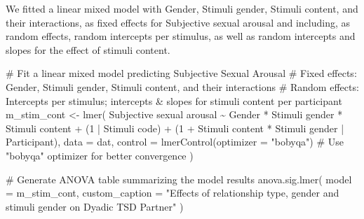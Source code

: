 \documentclass[
  bookmarksnumbered]{article}
\newenvironment{Shaded}{\begin{snugshade}}{\end{snugshade}}
\newcommand{\AttributeTok}[1]{\textcolor[rgb]{0.80,0.80,0.80}{#1}}
\newcommand{\CommentTok}[1]{\textcolor[rgb]{0.50,0.62,0.50}{#1}}
\newcommand{\DecValTok}[1]{\textcolor[rgb]{0.86,0.86,0.80}{#1}}
\newcommand{\FunctionTok}[1]{\textcolor[rgb]{0.94,0.94,0.56}{#1}}
\newcommand{\NormalTok}[1]{\textcolor[rgb]{0.80,0.80,0.80}{#1}}
\newcommand{\OtherTok}[1]{\textcolor[rgb]{0.94,0.94,0.56}{#1}}
\newcommand{\SpecialCharTok}[1]{\textcolor[rgb]{0.86,0.64,0.64}{#1}}
\newcommand{\StringTok}[1]{\textcolor[rgb]{0.80,0.58,0.58}{#1}}
\begin{document}
We fitted a linear mixed model with Gender, Stimuli gender, Stimuli content, and their interactions, as fixed effects for Subjective sexual arousal and including, as random effects, random intercepts per stimulus, as well as random intercepts and slopes for the effect of stimuli content.

\begin{Shaded}
\begin{Highlighting}[]
\CommentTok{\# Fit a linear mixed model predicting Subjective Sexual Arousal}
\CommentTok{\# Fixed effects: Gender, Stimuli gender, Stimuli content, and their interactions}
\CommentTok{\# Random effects: Intercepts per stimulus; intercepts \& slopes for stimuli content per participant}
\NormalTok{m\_stim\_cont }\OtherTok{\textless{}{-}} \FunctionTok{lmer}\NormalTok{(}
  \StringTok{\textasciigrave{}}\AttributeTok{Subjective sexual arousal}\StringTok{\textasciigrave{}} \SpecialCharTok{\textasciitilde{}}\NormalTok{ Gender }\SpecialCharTok{*} \StringTok{\textasciigrave{}}\AttributeTok{Stimuli gender}\StringTok{\textasciigrave{}} \SpecialCharTok{*} \StringTok{\textasciigrave{}}\AttributeTok{Stimuli content}\StringTok{\textasciigrave{}} \SpecialCharTok{+}
\NormalTok{    (}\DecValTok{1} \SpecialCharTok{|} \StringTok{\textasciigrave{}}\AttributeTok{Stimuli code}\StringTok{\textasciigrave{}}\NormalTok{) }\SpecialCharTok{+}
\NormalTok{    (}\DecValTok{1} \SpecialCharTok{+} \StringTok{\textasciigrave{}}\AttributeTok{Stimuli content}\StringTok{\textasciigrave{}} \SpecialCharTok{*} \StringTok{\textasciigrave{}}\AttributeTok{Stimuli gender}\StringTok{\textasciigrave{}} \SpecialCharTok{|}\NormalTok{ Participant),}
  \AttributeTok{data =}\NormalTok{ dat,}
  \AttributeTok{control =} \FunctionTok{lmerControl}\NormalTok{(}\AttributeTok{optimizer =} \StringTok{"bobyqa"}\NormalTok{) }\CommentTok{\# Use "bobyqa" optimizer for better convergence}
\NormalTok{)}

\CommentTok{\# Generate ANOVA table summarizing the model results}
\FunctionTok{anova.sig.lmer}\NormalTok{(}
  \AttributeTok{model =}\NormalTok{ m\_stim\_cont,}
  \AttributeTok{custom\_caption =} \StringTok{"Effects of relationship type, gender and stimuli gender on Dyadic TSD Partner"}
\NormalTok{)}
\end{Highlighting}
\end{Shaded}
\end{document}
